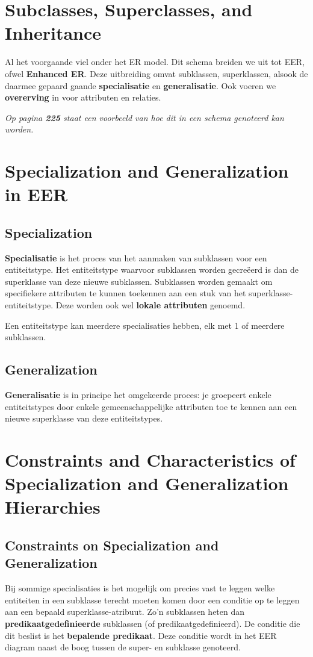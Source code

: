 \section{Subclasses, Superclasses, and Inheritance}
Al het voorgaande viel onder het ER model. Dit schema breiden we uit tot EER, ofwel \textbf{Enhanced ER}. Deze uitbreiding omvat subklassen, superklassen, alsook de daarmee gepaard gaande \textbf{specialisatie} en \textbf{generalisatie}. Ook voeren we \textbf{overerving} in voor attributen en relaties.

\textit{Op pagina \textbf{225} staat een voorbeeld van hoe dit in een schema genoteerd kan worden.}


\section{Specialization and Generalization in EER}
\subsection{Specialization}
\textbf{Specialisatie} is het proces van het aanmaken van subklassen voor een entiteitstype. Het entiteitstype waarvoor subklassen worden gecre\"eerd is dan de superklasse van deze nieuwe subklassen. Subklassen worden gemaakt om specifiekere attributen te kunnen toekennen aan een stuk van het superklasse-entiteitstype. Deze worden ook wel \textbf{lokale attributen} genoemd.

Een entiteitstype kan meerdere specialisaties hebben, elk met 1 of meerdere subklassen.

\subsection{Generalization}
\textbf{Generalisatie} is in principe het omgekeerde proces: je groepeert enkele entiteitstypes door enkele gemeenschappelijke attributen toe te kennen aan een nieuwe superklasse van deze entiteitstypes.


\section{Constraints and Characteristics of Specialization and Generalization Hierarchies}
\subsection{Constraints on Specialization and Generalization}
Bij sommige specialisaties is het mogelijk om precies vast te leggen welke entiteiten in een subklasse terecht moeten komen door een conditie op te leggen aan een bepaald superklasse-atribuut. Zo'n subklassen heten dan \textbf{predikaatgedefinieerde} subklassen (of predikaatgedefinieerd). De conditie die dit beslist is het \textbf{bepalende predikaat}. Deze conditie wordt in het EER diagram naast de boog tussen de super- en subklasse genoteerd.

